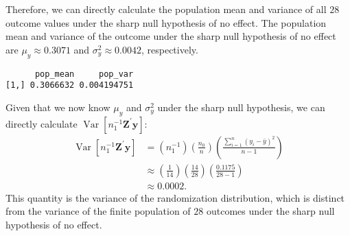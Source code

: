 \documentclass[
  12pt,
  leqno]{article}
\newenvironment{Shaded}{\begin{snugshade}}{\end{snugshade}}
\newcommand{\DecValTok}[1]{\textcolor[rgb]{0.00,0.00,0.81}{#1}}
\newcommand{\FunctionTok}[1]{\textcolor[rgb]{0.00,0.00,0.00}{#1}}
\newcommand{\NormalTok}[1]{#1}
\newcommand{\OtherTok}[1]{\textcolor[rgb]{0.56,0.35,0.01}{#1}}
\newcommand{\SpecialCharTok}[1]{\textcolor[rgb]{0.00,0.00,0.00}{#1}}
\DeclareMathOperator{\Var}{\mathrm{Var}}
\DeclareMathOperator{\1}{\mathbbm{1}}
\begin{document}
Therefore, we can directly calculate the population mean and variance of
all \(28\) outcome values under the sharp null hypothesis of no effect.
The population mean and variance of the outcome under the sharp null
hypothesis of no effect are \(\mu_{y} \approx 0.3071\) and
\(\sigma^2_{y} \approx 0.0042\), respectively.

\scriptsize

\begin{Shaded}
\end{Shaded}

\begin{verbatim}
      pop_mean     pop_var
[1,] 0.3066632 0.004194751
\end{verbatim}

\normalsize

Given that we now know \(\mu_{y}\) and \(\sigma^2_{y}\) under the sharp
null hypothesis, we can directly calculate
\(\Var\left[n_1^{-1} \mathbf{Z}^{\prime} \mathbf{y}\right]\):
\begin{align*}
\Var\left[n_1^{-1} \mathbf{Z}^{\prime} \mathbf{y}\right] & = \left(n_1^{-1}\right) \left(\frac{n_0}{n}\right) \left(\frac{\sum \limits_{i = 1}^n \left(y_i - \bar{y}\right)^2}{n - 1}\right) \\
& \approx \left(\frac{1}{14}\right) \left(\frac{14}{28}\right) \left(\frac{0.1175}{28 - 1}\right) \\
& \approx 0.0002.
\end{align*} This quantity is the variance of the randomization
distribution, which is distinct from the variance of the finite
population of \(28\) outcomes under the sharp null hypothesis of no
effect.

\scriptsize
\end{document}

